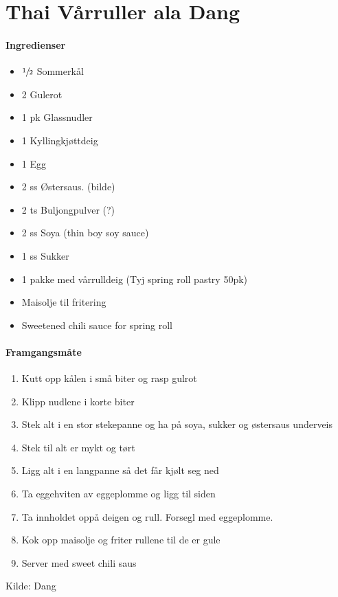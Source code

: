 \section{﻿Thai Vårruller ala Dang}


\paragraph{Ingredienser}
\begin{itemize}[noitemsep]
	\item  $\sfrac{1}{2}$  Sommerkål
	\item 2 Gulerot
	\item 1 pk Glassnudler
	\item 1 Kyllingkjøttdeig
	\item 1 Egg
	\item 2 ss Østersaus. (bilde)
	\item 2 ts Buljongpulver (?)
	\item 2 ss Soya (thin boy soy sauce)
	\item 1 ss Sukker
	\item 1 pakke med vårrulldeig (Tyj spring roll pastry 50pk)
	\item Maisolje til fritering
	\item Sweetened chili sauce for spring roll
\end{itemize}

\paragraph{Framgangsmåte}
\begin{enumerate}[noitemsep]
	\item Kutt opp kålen i små biter og rasp gulrot
	\item Klipp nudlene i korte biter
	\item Stek alt i en stor stekepanne og ha  på soya, sukker og østersaus underveis
	\item Stek til alt er mykt og tørt
	\item Ligg alt i en langpanne så det får kjølt seg ned
	\item Ta eggehviten av eggeplomme og ligg til siden
	\item Ta innholdet oppå deigen og rull.  Forsegl med eggeplomme.
	\item Kok opp maisolje og friter rullene til de er gule
	\item Server med sweet chili saus
\end{enumerate}

Kilde: Dang
